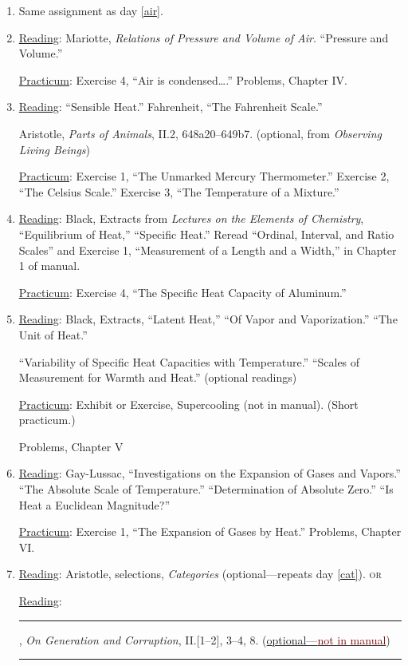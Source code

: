 \documentclass{article}
\newcommand{\rd}{\uline{Reading}}
\newcommand{\pc}{\uline{Practicum}}
\begin{document}
\begin{enumerate}
\pc: Exercise 1, ``Construction of a Barometer.'' In place of a mercury barometer, make a water barometer in the pendulum pit.
Exercise 2: ``The Experiment of Perier.'' Instead of constructing barometers, read barometers installed at the Boathouse and in the McDowell cupola; bring semi-inflated taped balloons.
The Cartesian diver. Exhibit 3: “The Constant Flow Reservoir.” 

\item Same assignment as day \ref{air}.

\item \rd:  Mariotte, \emph{Relations of Pressure and Volume of Air}. ``Pressure and Volume.'' 

	\pc: Exercise 4, ``Air is condensed\dots.'' Problems, Chapter IV.
\item \rd:  ``Sensible Heat.'' Fahrenheit, ``The Fahrenheit
	Scale.''
	
	Aristotle, \emph{Parts of Animals}, II.2, 648a20--649b7. (optional, from \emph{Observing Living Beings}) 

	\pc: Exercise 1, ``The Unmarked Mercury Thermometer.'' Exercise 2, ``The Celsius Scale.'' Exercise 3, ``The Temperature of a Mixture.''

\item \rd: Black, Extracts from \emph{Lectures on the Elements of Chemistry}, ``Equilibrium of Heat,'' ``Specific Heat.'' Reread ``Ordinal, Interval, and Ratio Scales'' and Exercise 1,
``Measurement of a Length and a Width,'' in Chapter 1 of manual. 

	\pc: Exercise 4, ``The Specific Heat Capacity of Aluminum.''

\item \rd: Black, Extracts, ``Latent Heat,'' ``Of Vapor and Vaporization.'' ``The Unit of Heat.'' 

``Variability of Specific Heat Capacities with
Temperature.'' ``Scales of Measurement for Warmth and Heat.'' (optional readings)

	\pc: Exhibit or Exercise,  Supercooling (not in manual). (Short practicum.) 
	
	Problems, Chapter V

\item \rd: Gay-Lussac, ``Investigations on the Expansion of Gases
and Vapors.'' ``The Absolute Scale of Temperature.'' ``Determination of Absolute Zero.'' ``Is
Heat a Euclidean Magnitude?''

\pc: Exercise 1, ``The Expansion of Gases by Heat.'' Problems, Chapter VI.

\item \rd: Aristotle, selections, \emph{Categories} (optional---repeats day \ref{cat}). \textsc{or}

\rd: \rule[0ex]{8mm}{0.5pt}, \emph{On Generation and Corruption}, II.[1--2], 3--4, 8. (\href{https://sjca.sharepoint.com/:b:/r/sites/Departments/Faculty/Documents/Annapolis/Freshman\%20Lab/Schedule\%20and\%20files/Arist_Gen_Corrup.pdf?csf=1&web=1&e=3vRrTS}{optional---\textcolor{Maroon}{not in manual}}) \rule{1.2ex}{1.2ex}
\end{enumerate}
\end{document}
